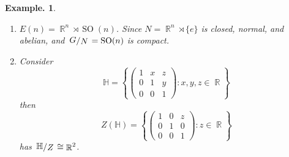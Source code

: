 \documentclass[11pt, a4paper]{memoir}
\makeatletter
\DeclareMathOperator{\R}{{\mathbb{R}}}
\DeclareMathOperator{\C}{{\mathbb{C}}}
\providecommand*{\cupdot}{%
  \mathbin{%
    \mathpalette\@cupdot{}%
  }%
}
\newcommand*{\@cupdot}[2]{%
  \ooalign{%
    $\m@th#1\cup$\cr
    \sbox0{$#1\cup$}%
    \dimen@=\ht0 %
    \sbox0{$\m@th#1\cdot$}%
    \advance\dimen@ by -\ht0 %
    \dimen@=.5\dimen@
    \hidewidth\raise\dimen@\box0\hidewidth
  }%
}
\theoremstyle{change}
\theoremstyle{plain}
\theoremstyle{nonumberplain}
\newtheorem{example}{Example.}
\DeclareMathOperator{\GL}{GL}
\newcommand{\quot}[2]{\mathchoice{\left.\raisebox{0.14em}{$#1$}\middle/\raisebox{-0.14em}{$#2$}\right.}
                                 {\left.\raisebox{0.08em}{$#1$}\middle/\raisebox{-0.08em}{$#2$}\right.}
                                 {\left.\raisebox{0.03em}{$#1$}\middle/\raisebox{-0.03em}{$#2$}\right.}
                                 {\left.\raisebox{0em}{$#1$}\middle/\raisebox{0em}{$#2$}\right.}}
\DeclareMathOperator{\SO}{SO}
\numberwithin{equation}{section}
\makeatother
\begin{document}
\begin{example}
\begin{enumerate}[r]
            If $\mathfrak{k}=\C$ or $\mathfrak{k}=\R$ and $n$ is odd, $H=G$.
            Else if $\mathfrak{k}=\R$ and $n$ is even, then $H=\GL_n(\R)_e=\det^{-1}((0,\infty))$ (connnected component of $e$) and $G=\GL_n(\R)_e\cupdot(-e)\GL_n(\R)_e$, so $\quot{G}{H}\cong\{-1,1\}$ is compact.
        \item $E(n)=\R^n \rtimes \SO(n)$.
            Since $N=\R^n\rtimes\{e\}$ is closed, normal, and abelian, and $\quot{G}{N}=\SO(n)$ is compact.
        \item Consider
            \begin{equation*}
                \mathbb{H}=\left\{\begin{pmatrix}1&x&z\\0&1&y\\0&0&1\end{pmatrix}:x,y,z\in\R\right\}
            \end{equation*}
            then
            \begin{equation*}
                Z(\mathbb{H})=\left\{\begin{pmatrix}1&0&z\\0&1&0\\0&0&1\end{pmatrix}:z\in\R\right\}
            \end{equation*}
            has $\quot{\mathbb{H}}{Z}\cong\R^2$.
    \end{enumerate}
\end{example}
\end{document}

